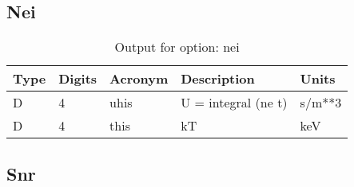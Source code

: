 \subsection{Nei}

\begin{table}[!p]
\caption{Output for option: nei}
\label{tabout:nei}
\begin{tabular}{lllll}
\hline
Type & Digits & Acronym & Description & Units \\ 
\hline
D &  4 & uhis & U = integral (ne t)              & s/m**3           \\
D &  4 & this & kT                               & keV              \\
\hline
\end{tabular}
\end{table}

\subsection{Snr}

